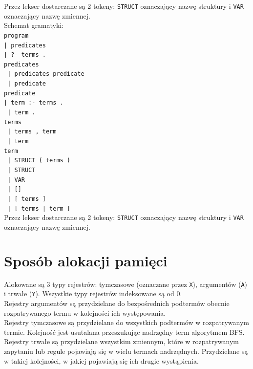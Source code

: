 Przez lekser dostarczane są 2 tokeny: \texttt{STRUCT} oznaczający nazwę struktury i \texttt{VAR} oznaczający nazwę zmiennej.\\
Schemat gramatyki:\\
\texttt{program}\\
\texttt{| predicates}\\
\texttt{| ?- terms .}\\
\texttt{predicates}\\
\texttt{                             | predicates predicate}\\
\texttt{                             | predicate}\\
\texttt{predicate}\\
\texttt{| term :- terms .}\\
\texttt{                             | term .}\\
\texttt{terms}\\
\texttt{                     | terms , term}\\
\texttt{                             | term}\\
\texttt{term}\\
\texttt{                     | STRUCT ( terms )}\\
\texttt{                             | STRUCT}\\
\texttt{                             | VAR}\\
\texttt{                             | []}\\
\texttt{                             | [ terms ]}\\
\texttt{                             | [ terms | term ]}\\

Przez lekser dostarczane są 2 tokeny: \texttt{STRUCT} oznaczający nazwę struktury i \texttt{VAR} oznaczający nazwę zmiennej.

\section{Sposób alokacji pamięci}

Alokowane są 3 typy rejestrów: tymczasowe (oznaczane przez \texttt{X}), argumentów (\texttt{A}) i trwałe (\texttt{Y}). Wszystkie typy rejestrów indeksowane są od 0.\\
Rejestry argumentów są przydzielane do bezpośrednich podtermów obecnie rozpatrywanego termu w kolejności ich występowania.\\
Rejestry tymczasowe są przydzielane do wszystkich podtermów w rozpatrywanym termie. Kolejność jest usutalana przeszukując nadrzędny term algorytmem BFS.\\
Rejestry trwałe są przydzielane wszystkim zmiennym, które w rozpatrywanym zapytaniu lub regule pojawiają się w wielu termach nadrzędnych. Przydzielane są w takiej kolejności, w jakiej pojawiają się ich drugie wystąpienia.
\fi


